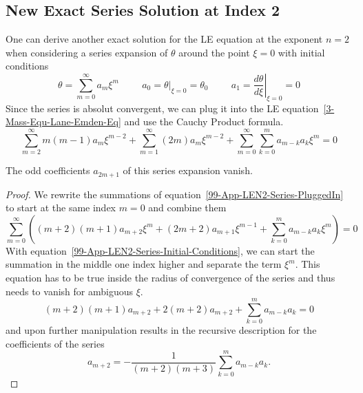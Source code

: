 \begin{appendix}
\begin{section}
\subsection{New Exact \texorpdfstring{}{LE} Series Solution at Index 2}
One can derive another exact solution for the \ac{LE} equation at the exponent $n=2$ when 
considering a series expansion of $\theta$ around the point $\xi=0$ with initial conditions
\begin{equation}
	\theta=\sum\limits_{m=0}^\infty a_m\xi^m \hspace{1cm} a_0=\left.\theta\right|_{\xi=0}=\theta_0 
	\hspace{1cm} a_1=\left.\frac{d\theta}{d\xi}\right|_{\xi=0}=0
	\label{99-App-LEN2-Series-Initial-Conditions}
\end{equation}
Since the series is absolut convergent, we can plug it into the \ac{LE} equation~\ref{3-Mass-Equ-Lane-Emden-Eq} and use the Cauchy Product formula.
\begin{equation}
	\sum\limits_{m=2}^\infty m(m-1)a_m\xi^{m-2}+\sum\limits_{m=1}^\infty (2m)a_m\xi^{m-2} + 
	\sum\limits_{m=0}^\infty\sum\limits_{k=0}^m a_{m-k}a_k\xi^m = 0
	\label{99-App-LEN2-Series-PluggedIn}
\end{equation}
\begin{theorem}
	The odd coefficients $a_{2m+1}$ of this series expansion vanish.
\end{theorem}
\begin{proof}
	We rewrite the summations of equation~\ref{99-App-LEN2-Series-PluggedIn} to start at the 
	same index $m=0$ and combine them
	\begin{equation}
		\sum\limits_{m=0}^\infty\left((m+2)(m+1)a_{m+2}\xi^{m}+(2m+2)a_{m+1}\xi^{m-1} + 
		\sum\limits_{k=0}^m a_{m-k}a_k\xi^m\right) = 0
	\end{equation}
	With equation~\ref{99-App-LEN2-Series-Initial-Conditions}, we can start the summation 
	in the middle one index higher and separate the term $\xi^m$. This equation has to be true 
	inside the radius of convergence of the series and thus needs to vanish for ambiguous $\xi$.
	\begin{equation}
		(m+2)(m+1)a_{m+2}+2(m+2)a_{m+2}+\sum\limits_{k=0}^ma_{m-k}a_k = 0
	\end{equation}
	and upon further manipulation results in the recursive description for the coefficients 
	of the series
	\begin{equation}
		a_{m+2} = -\frac{1}{(m+2)(m+3)}\sum\limits_{k=0}^ma_{m-k}a_k.
		\label{99-App-LEN2-Recursive-Coefficients}

\end{equation}
\end{proof}
\end{section}
\end{appendix}

